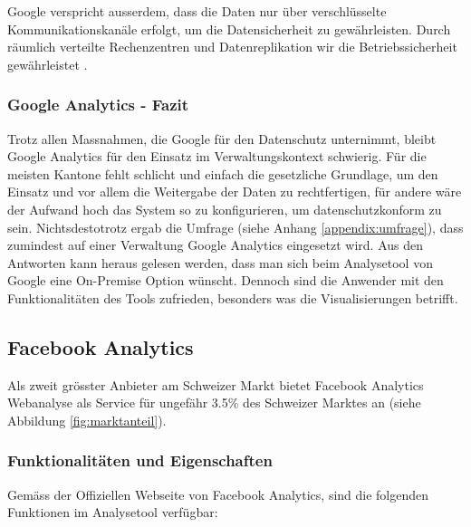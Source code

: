 Google verspricht ausserdem, dass die Daten nur über verschlüsselte Kommunikationskanäle erfolgt, um die Datensicherheit zu gewährleisten. Durch räumlich verteilte Rechenzentren und Datenreplikation wir die Betriebssicherheit gewährleistet \parencite{GoogleAnalyticsDatenschutz}.

\subsubsection{Google Analytics - Fazit}
Trotz allen Massnahmen, die Google für den Datenschutz unternimmt, bleibt Google Analytics für den Einsatz im Verwaltungskontext schwierig. Für die meisten Kantone fehlt schlicht und einfach die gesetzliche Grundlage, um den Einsatz und vor allem die Weitergabe der Daten zu rechtfertigen, für andere wäre der Aufwand hoch das System so zu konfigurieren, um datenschutzkonform zu sein. Nichtsdestotrotz ergab die Umfrage (siehe Anhang \ref{appendix:umfrage}), dass zumindest auf einer Verwaltung Google Analytics eingesetzt wird. Aus den Antworten kann heraus gelesen werden, dass man sich beim Analysetool von Google eine On-Premise Option wünscht. Dennoch sind die Anwender mit den Funktionalitäten des Tools zufrieden, besonders was die Visualisierungen betrifft.

\subsection{Facebook Analytics} \label{subsec:FacebookAnalytics}

Als zweit grösster Anbieter am Schweizer Markt bietet Facebook Analytics Webanalyse als Service für ungefähr 3.5\% des Schweizer Marktes an (siehe Abbildung \ref{fig:marktanteil}).

\subsubsection{Funktionalitäten und Eigenschaften}
Gemäss der Offiziellen Webseite von Facebook Analytics, sind die folgenden Funktionen im Analysetool verfügbar:

